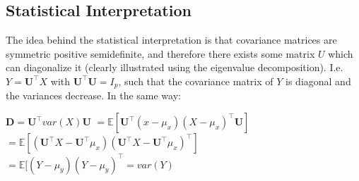 \documentclass[english]{latex4ei/latex4ei_sheet}
\begin{document}
\begin{sectionbox}
\subsection{Statistical Interpretation}
The idea behind the statistical interpretation is that covariance matrices are symmetric positive semidefinite, and therefore there exists some matrix $U$ which can diagonalize it (clearly illustrated using the eigenvalue decomposition). I.e. $Y=\mathbf{U}^{\top}X$ with $\mathbf{U}^{\top}\mathbf{U}=I_p$, such that the covariance matrix of $Y$ is diagonal and the variances decrease. In the same way:
\begin{emphbox}
        $\mathbf{D}=\mathbf{U}^{\top}var(X)\mathbf{U} $
        $= \mathbb{E}[\mathbf{U}^{\top}(x-\mu_x)(X-\mu_x)^{\top}\mathbf{U}]$
        $=\mathbb{E}[(\mathbf{U}^{\top}X-\mathbf{U}^{\top}\mu_x)(\mathbf{U}^{\top}X-\mathbf{U}^{\top}\mu_x)^{\top}]$
        $=\mathbb{E}[(Y-\mu_y)(Y-\mu_y)^{\top}=var(Y)$
\end{emphbox}
\end{sectionbox}
\end{document}
